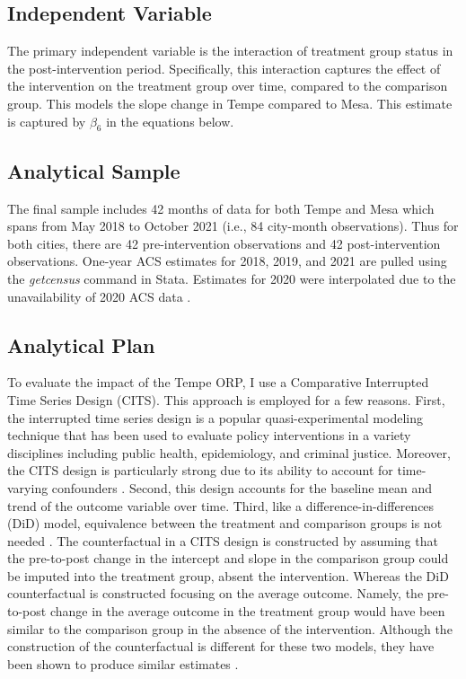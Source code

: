 \subsection{Independent Variable}
The primary independent variable is the interaction of treatment group status in the post-intervention period. Specifically, this interaction captures the effect of the intervention on the treatment group over time, compared to the comparison group. This models the slope change in Tempe compared to Mesa. This estimate is captured by \(\beta_6\) in the equations below.

\subsection{Analytical Sample}
The final sample includes 42 months of data for both Tempe and Mesa which spans from May 2018 to October 2021 (i.e., 84 city-month observations). Thus for both cities, there are 42 pre-intervention observations and 42 post-intervention observations. One-year ACS estimates for 2018, 2019, and 2021 are pulled using the \textit{getcensus} command in Stata. Estimates for 2020 were interpolated due to the unavailability of 2020 ACS data \parencite{chamberlain_relative_2016}.

\subsection{Analytical Plan}

To evaluate the impact of the Tempe ORP, I use a Comparative Interrupted Time Series Design (CITS). This approach is employed for a few reasons. First, the interrupted time series design is a popular quasi-experimental modeling technique that has been used to evaluate policy interventions in a variety disciplines including public health, epidemiology, and criminal justice. Moreover, the CITS design is particularly strong due to its ability to account for time-varying confounders \parencite{lopez_bernal_use_2018}. Second, this design accounts for the baseline mean and trend of the outcome variable over time. Third, like a difference-in-differences (DiD) model, equivalence between the treatment and comparison groups is not needed \parencite{anglin_validity_2023}. The counterfactual in a CITS design is constructed by assuming that the pre-to-post change in the intercept and slope in the comparison group could be imputed into the treatment group, absent the intervention. Whereas the DiD counterfactual is constructed focusing on the average outcome. Namely, the pre-to-post change in the average outcome in the treatment group would have been similar to the comparison group in the absence of the intervention. Although the construction of the counterfactual is different for these two models, they have been shown to produce similar estimates \parencite{anglin_validity_2023, somers_validity_2013}. 

